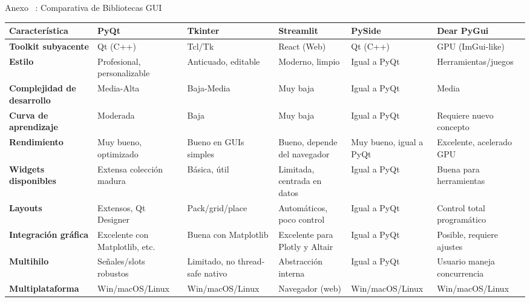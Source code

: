 \begin{frame}{Anexo \thesection~: Comparativa de Bibliotecas GUI}
    \centering
    \label{tab:gui-comparativa-beamer}
    \vspace{-0.1cm}
    \begin{adjustbox}{max width=\textwidth, max height=0.8\textheight, keepaspectratio}
        \renewcommand{\arraystretch}{1.2}
        \scriptsize
        \begin{tabular}{
          @{}>{\bfseries}p{}
          >{\columncolor{yellow!30}}p{}
          p{}
          p{}
          p{}
          p{}@{}}
        \toprule
        \textbf{Característica} & \textbf{PyQt} & \textbf{Tkinter} & \textbf{Streamlit} & \textbf{PySide} & \textbf{Dear PyGui} \\
        \midrule
        Toolkit subyacente & Qt (C++) & Tcl/Tk & React (Web) & Qt (C++) & GPU (ImGui-like) \\
        Estilo & Profesional, personalizable & Anticuado, editable & Moderno, limpio & Igual a PyQt & Herramientas/juegos \\
        Complejidad de desarrollo & Media-Alta & Baja-Media & Muy baja & Igual a PyQt & Media \\
        Curva de aprendizaje & Moderada & Baja & Muy baja & Igual a PyQt & Requiere nuevo concepto \\
        Rendimiento & Muy bueno, optimizado & Bueno en GUIs simples & Bueno, depende del navegador & Muy bueno, igual a PyQt & Excelente, acelerado GPU\\
        Widgets disponibles & Extensa colección madura & Básica, útil & Limitada, centrada en datos & Igual a PyQt & Buena para herramientas\\
        Layouts & Extensos, Qt Designer & Pack/grid/place & Automáticos, poco control        & Igual a PyQt & Control total programático \\
        Integración gráfica & Excelente con Matplotlib, etc. & Buena con Matplotlib & Excelente para Plotly y Altair & Igual a PyQt & Posible, requiere ajustes      \\
        Multihilo & Señales/slots robustos & Limitado, no thread-safe nativo  & Abstracción interna & Igual a PyQt & Usuario maneja concurrencia \\
        Multiplataforma & Win/macOS/Linux  & Win/macOS/Linux & Navegador (web) & Win/macOS/Linux & Win/macOS/Linux \\

\end{tabular}
\end{adjustbox}
\end{frame}
